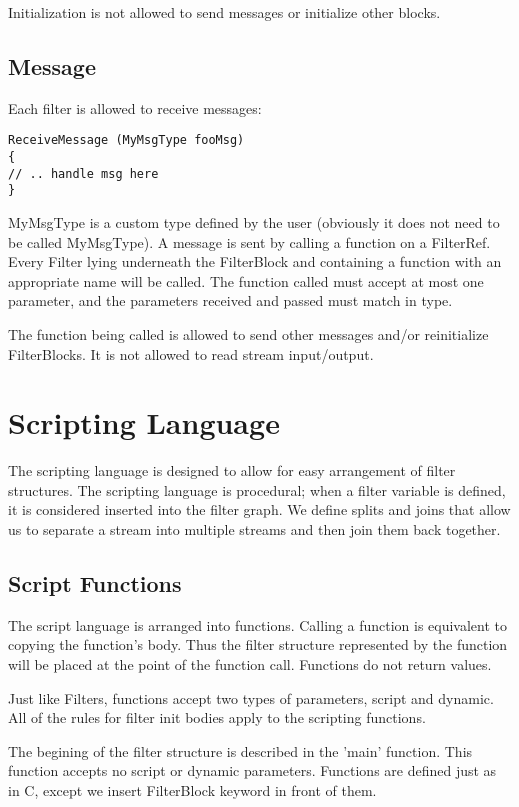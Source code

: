 \documentclass[twocolumn, draft]{article}
\begin{document}
Initialization is not allowed to send messages or initialize other blocks.

\subsection{Message}

Each filter is allowed to receive messages:

\begin{verbatim}
ReceiveMessage (MyMsgType fooMsg)
{
// .. handle msg here
}
\end{verbatim}

MyMsgType is a custom type defined by the user (obviously it does not need
to be called MyMsgType).  A message is sent by calling a function on a
FilterRef.  Every Filter lying underneath the FilterBlock and containing
a function with an appropriate name will be called.  The function called
must accept at most one parameter, and the parameters received and passed
must match in type.

The function being called is allowed to send other messages and/or reinitialize
FilterBlocks.  It is not allowed to read stream input/output.

\section{Scripting Language}

The scripting language is designed to allow for easy arrangement of 
filter structures.  The scripting language is procedural;  when a filter
variable is defined, it is considered inserted into the filter graph.
We define splits and joins that allow us to separate a stream into multiple
streams and then join them back together.

\subsection{Script Functions}

The script language is arranged into functions.  Calling a function is
equivalent to copying the function's body.  Thus the filter structure 
represented by the function will be placed at the point of the function
call.  Functions do not return values.

Just like Filters, functions accept two types of parameters, script
and dynamic.  All of the rules for filter init bodies apply to the
scripting functions.

The begining of the filter structure is described in the 'main' function.
This function accepts no script or dynamic parameters.
Functions are defined just as in C, except we insert FilterBlock
keyword in front of them.
\end{document}
